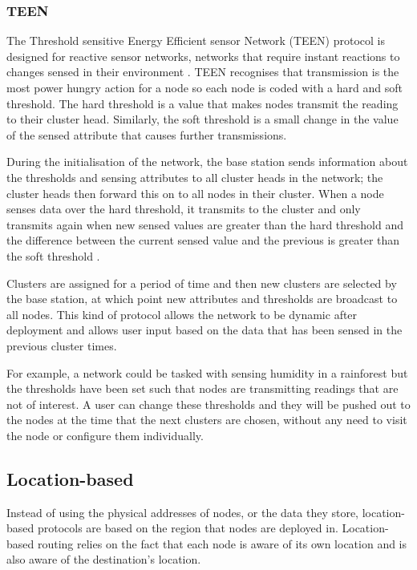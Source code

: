 \subsubsection{TEEN}
	The Threshold sensitive Energy Efficient sensor Network (TEEN) protocol is designed for reactive sensor networks, networks that require instant reactions to changes sensed in their environment \cite{Manjeshwar2001}. TEEN recognises that transmission is the most power hungry action for a node so each node is coded with a hard and soft threshold. The hard threshold is a value that makes nodes transmit the reading to their cluster head. Similarly, the soft threshold is a small change in the value of the sensed attribute that causes further transmissions.

During the initialisation of the network, the base station sends information about the thresholds and sensing attributes to all cluster heads in the network; the cluster heads then forward this on to all nodes in their cluster.  When a node senses data over the hard threshold, it transmits to the cluster and only transmits again when new sensed values are greater than the hard threshold and the difference between the current sensed value and the previous is greater than the soft threshold \cite{Manjeshwar2001}.

Clusters are assigned for a period of time and then new clusters are selected by the base station, at which point new attributes and thresholds are broadcast to all nodes. This kind of protocol allows the network to be dynamic after deployment and allows user input based on the data that has been sensed in the previous cluster times. 

For example, a network could be tasked with sensing humidity in a rainforest but the thresholds have been set such that nodes are transmitting readings that are not of interest. A user can change these thresholds and they will be pushed out to the nodes at the time that the next clusters are chosen, without any need to visit the node or configure them individually.

\subsection{Location-based}
	Instead of using the physical addresses of nodes, or the data they store, location-based protocols are based on the region that nodes are deployed in. Location-based routing relies on the fact that each node is aware of its own location and is also aware of the destination's location.


